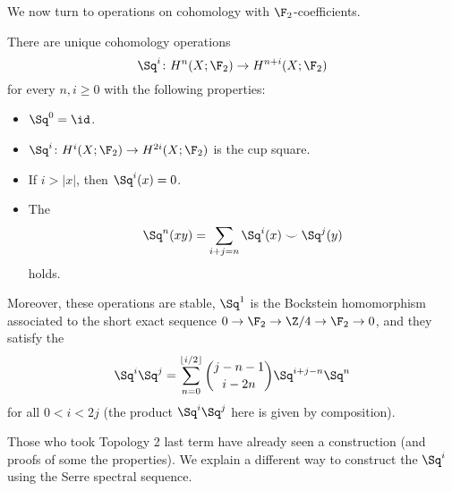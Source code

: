 We now turn to operations on cohomology with $\F_2$-coefficients.
\begin{theorem}[Steenrod]
	There are unique cohomology operations
	\begin{equation*}
		\Sq^i\colon H^n(X; \F_2) \to H^{n + i}(X; \F_2)
	\end{equation*}
	for every $n, i \geq 0$ with the following properties:
	\begin{itemize}
		\item $\Sq^0 = \id$.
		\item $\Sq^i\colon H^i(X; \F_2) \to H^{2i}(X; \F_2)$ is the cup square.
		\item If $i > |x|$, then $\Sq^i(x) = 0$.
		\item The 
			\begin{equation*}
				\Sq^n(x y) = \sum_{i + j = n} \Sq^i(x) \smile \Sq^j(y)
			\end{equation*}
			holds.
	\end{itemize}
	Moreover, these operations are stable, $\Sq^1$ is the Bockstein homomorphism associated to the short exact sequence $0 \to \F_2 \to \Zn{4} \to \F_2 \to 0$, and they satisfy the 
	\begin{equation*}
		\Sq^i \Sq^j = \sum_{n = 0}^{\lfloor i / 2\rfloor} \binom{j - n - 1}{i - 2n} \Sq^{i + j - n} \Sq^n
	\end{equation*}
	for all $0 < i < 2j$ (the product $\Sq^i \Sq^j$ here is given by composition).
\end{theorem}
Those who took Topology 2 last term have already seen a construction (and proofs of some the properties).
We explain a different way to construct the $\Sq^i$ using the Serre spectral sequence.

